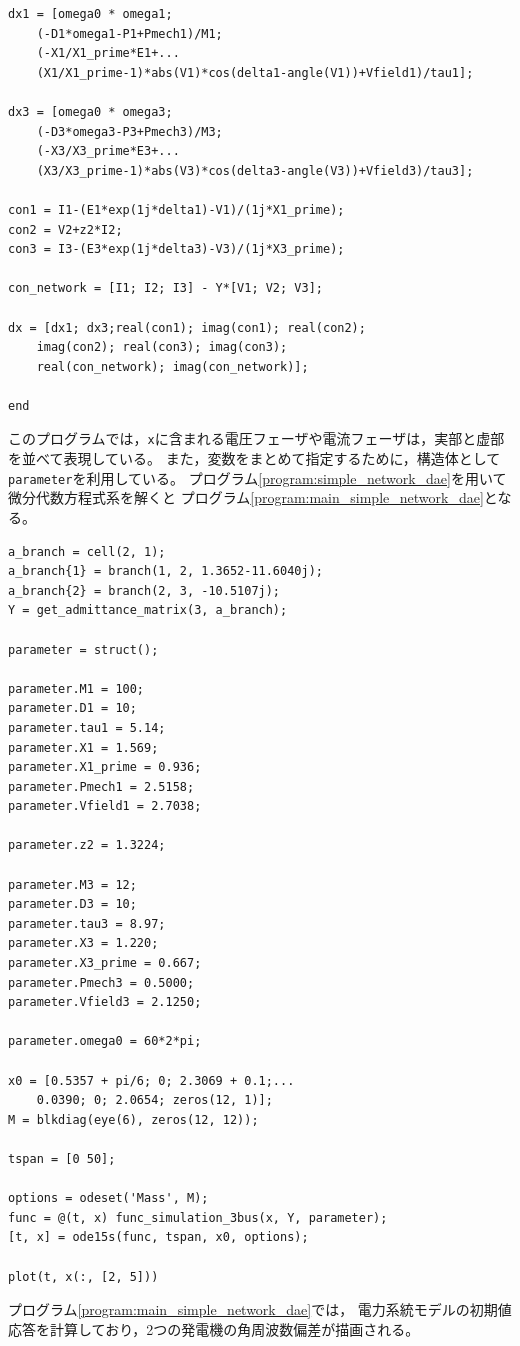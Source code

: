 \documentclass[tombow,dvipdfmx]{corona-a5-1.1}
\begin{document}
\begin{例}[電力系統のシミュレーションの単純な実装]
\begin{PROGRAMA}[count,title={func\_simulation\_3bus.m}]
\begin{verbatim}
dx1 = [omega0 * omega1;
    (-D1*omega1-P1+Pmech1)/M1;
    (-X1/X1_prime*E1+...
    (X1/X1_prime-1)*abs(V1)*cos(delta1-angle(V1))+Vfield1)/tau1];

dx3 = [omega0 * omega3;
    (-D3*omega3-P3+Pmech3)/M3;
    (-X3/X3_prime*E3+...
    (X3/X3_prime-1)*abs(V3)*cos(delta3-angle(V3))+Vfield3)/tau3];

con1 = I1-(E1*exp(1j*delta1)-V1)/(1j*X1_prime);
con2 = V2+z2*I2;
con3 = I3-(E3*exp(1j*delta3)-V3)/(1j*X3_prime);

con_network = [I1; I2; I3] - Y*[V1; V2; V3];

dx = [dx1; dx3;real(con1); imag(con1); real(con2);
    imag(con2); real(con3); imag(con3);
    real(con_network); imag(con_network)];

end
\end{verbatim}
\end{PROGRAMA}

このプログラムでは，\verb|x|に含まれる電圧フェーザや電流フェーザは，実部と虚部を並べて表現している。
また，変数をまとめて指定するために，構造体として\verb|parameter|を利用している。
プログラム\ref{program:simple_network_dae}を用いて微分代数方程式系を解くと
プログラム\nobreak\ref{program:main_simple_network_dae}となる。

\smallskip
\begin{PROGRAMA}[count,title={main\_simulation\_simple.m}]\label{program:main_simple_network_dae}
\begin{verbatim}
a_branch = cell(2, 1);
a_branch{1} = branch(1, 2, 1.3652-11.6040j);
a_branch{2} = branch(2, 3, -10.5107j);
Y = get_admittance_matrix(3, a_branch);

parameter = struct();

parameter.M1 = 100;
parameter.D1 = 10;
parameter.tau1 = 5.14;
parameter.X1 = 1.569;
parameter.X1_prime = 0.936;
parameter.Pmech1 = 2.5158;
parameter.Vfield1 = 2.7038;

parameter.z2 = 1.3224;

parameter.M3 = 12;
parameter.D3 = 10;
parameter.tau3 = 8.97;
parameter.X3 = 1.220;
parameter.X3_prime = 0.667;
parameter.Pmech3 = 0.5000;
parameter.Vfield3 = 2.1250;

parameter.omega0 = 60*2*pi;

x0 = [0.5357 + pi/6; 0; 2.3069 + 0.1;...
    0.0390; 0; 2.0654; zeros(12, 1)];
M = blkdiag(eye(6), zeros(12, 12));

tspan = [0 50];

options = odeset('Mass', M);
func = @(t, x) func_simulation_3bus(x, Y, parameter);
[t, x] = ode15s(func, tspan, x0, options); 

plot(t, x(:, [2, 5]))
\end{verbatim}
\end{PROGRAMA}

プログラム\nobreak\ref{program:main_simple_network_dae}では，
電力系統モデルの初期値応答を計算しており，2つの発電機の角周波数偏差が描画される。
\end{例}
\end{document}
